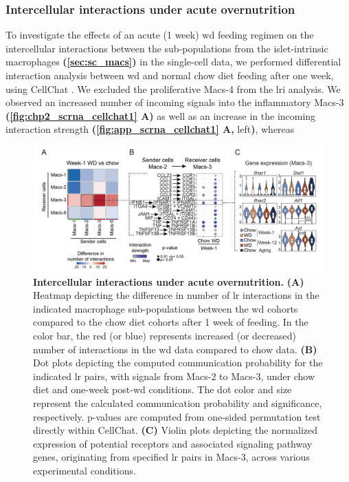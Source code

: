 \subsubsection{\large Intercellular interactions under acute overnutrition}
 
To investigate the effects of an acute (1 week) \gls{wd} feeding regimen on the intercellular interactions between the sub-populations from the islet-intrinsic macrophages \textbf{(\autoref{sec:sc_macs})} in the single-cell data, we performed differential interaction analysis between \gls{wd} and normal chow diet feeding after one week, using CellChat \textbf{\cite{jin_cellchat_2023}}. We excluded the proliferative Macs-4 from the \gls{lri} analysis. We observed an increased number of incoming signals into the inflammatory Macs-3 \textbf{(\autoref{fig:chp2_scrna_cellchat1} A)} as well as an increase in the incoming interaction strength \textbf{(\autoref{fig:app_scrna_cellchat1} A,} left\textbf{)}, whereas 

\begin{figure}[H]
\centering
\includegraphics[width=\linewidth]{Chapter4/Fig/F2-6-01.png}
\caption[Intercellular interactions under acute overnutrition]{\textbf{Intercellular interactions under acute overnutrition.} \textbf{(A)} Heatmap depicting the difference in number of \gls{lr} interactions in the indicated macrophage sub-populations between the \gls{wd} cohorts compared to the chow diet cohorts after 1 week of feeding. In the color bar, the red (or blue) represents increased (or decreased) number of interactions in the \gls{wd} data compared to chow data. \textbf{(B)} Dot plots depicting the computed communication probability for the indicated \gls{lr} pairs, with signals from Macs-2 to Macs-3, under chow diet and one-week post-\gls{wd} conditions. The dot color and size represent the calculated communication probability and significance, respectively. p-values are computed from one-sided permutation test directly within CellChat. \textbf{(C)} Violin plots depicting the normalized expression of potential receptors and associated signaling pathway genes, originating from specified \gls{lr} pairs in Macs-3, across various experimental conditions.}
\label{fig:chp2_scrna_cellchat1}
\end{figure}


